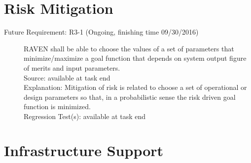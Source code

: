 \documentclass{article}
\newcommand{\futurerequirement}[6]{\item[Future Requirement: #1 #6] #2 \\Source: #3\\Explanation: #4\\Regression Test(s): #5}
\begin{document}
\section{Risk Mitigation}

\begin{description}

\futurerequirement{R3-1}{RAVEN shall be able to choose the values of a set of parameters that minimize/maximize a goal function that depends on system output figure of merits and input parameters.}
{available at task end}
{Mitigation of risk is related to choose a set of operational or design parameters so that, in a probabilistic sense the risk driven goal function is minimized.}
{available at task end}
{(Ongoing, finishing time 09/30/2016)}
\end{description}

\section{Infrastructure Support}
\end{document}
